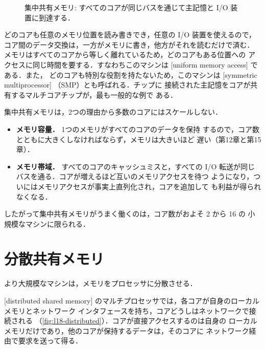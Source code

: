 \documentclass[../main.tex]{subfiles}
\begin{document}
\begin{figure}[htbp]
  \centering
  
  \caption{集中共有メモリ: すべてのコアが同じバスを通じて主記憶と I/O
    装置に到達する．}
  \label{fig:l18-centralized}
\end{figure}

どのコアも任意のメモリ位置を読み書きでき，任意の I/O 装置を使えるので，
コア間のデータ交換は，一方がメモリに書き，他方がそれを読むだけで済む．
メモリはすべてのコアから等しく離れているため，どのコアもある位置への
アクセスに同じ時間を要する．すなわちこのマシンは
[uniform memory access] である．また，
どのコアも特別な役割を持たないため，このマシンは
[symmetric multiprocessor]%
（SMP）とも呼ばれる．チップに
接続された主記憶をコアが共有するマルチコアチップが，最も一般的な例で
ある．

集中共有メモリは，2つの理由から多数のコアにはスケールしない．
\begin{itemize}
  \item \textbf{メモリ容量．} 1つのメモリがすべてのコアのデータを保持
    するので，コア数とともに大きくしなければならず，メモリは大きいほど
    遅い（第12章と第15章）．
  \item \textbf{メモリ帯域．} すべてのコアのキャッシュミスと，すべての
    I/O 転送が同じバスを通る．コアが増えるほど互いのメモリアクセスを待つ
    ようになり，ついにはメモリアクセスが事実上直列化され，コアを追加して
    も利益が得られなくなる．
\end{itemize}
したがって集中共有メモリがうまく働くのは，コア数がおよそ 2 から 16 の
小規模なマシンに限られる．

\section{分散共有メモリ}
\label{sec:l18-distributed}

より大規模なマシンは，メモリをプロセッサに分散させる．

\begin{definition}[分散共有メモリ]
  [distributed shared memory]%
  のマルチプロセッサでは，各コアが自身のローカルメモリとネットワーク
  インタフェースを持ち，コアどうしはネットワークで接続される
  （\cref{fig:l18-distributed}）．コアが直接アクセスするのは自身の
  ローカルメモリだけであり，他のコアが保持するデータは，そのコアに
  ネットワーク経由で要求を送って得る．
\end{definition}
\end{document}
